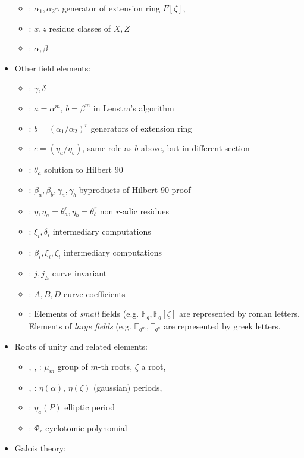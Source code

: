 \documentclass[12pt]{article}
\theoremstyle{plain}
\theoremstyle{definition}
\def\F{\ensuremath{\mathbb{F}}}
\newcounter{algorithm}
\begin{document}
\begin{itemize}
\begin{itemize}
  \item \kummer: $\alpha_1,\alpha_2\gamma$ generator of extension ring $F[\zeta]$,
  \item \kummer: $x,z$ residue classes of $X,Z$
  \item \rains: $\alpha,\beta$
  \end{itemize}
\item Other field elements:
  \begin{itemize}
  \item \poster: $\gamma, \delta$
  \item \poster: $a=\alpha^m$, $b=\beta^m$ in Lenstra's algorithm
  \item \kummer: $b=(\alpha_1/\alpha_2)^r$ generators of extension ring
  \item \kummer: $c=(\eta_a/\eta_b)$, same role as $b$ above, but in different section
  \item \kummer: $\theta_a$ solution to Hilbert 90
  \item \kummer: $\beta_a,\beta_b,\gamma_a,\gamma_b$ byproducts of Hilbert 90 proof
  \item \kummer: $\eta,\eta_a=\theta_a^r,\eta_b=\theta_b^r$ non $r$-adic residues
  \item \kummer: $\xi_i,\delta_i$ intermediary computations
  \item \kummer: $\beta_i,\xi_i,\zeta_i$ intermediary computations
  \item \rains: $j,j_E$ curve invariant
  \item \rains: $A,B,D$ curve coefficients
  \item \prop: Elements of \emph{small} fields (e.g. $\F_q,
    \F_q[\zeta]$ are represented by roman letters. Elements of
    \emph{large fields} (e.g. $\F_{q^m},\F_{q^n}$ are represented by
    greek letters.
  \end{itemize}
\item Roots of unity and related elements:
  \begin{itemize}
  \item \poster, \rains, \prop: $\mu_m$ group of $m$-th roots, $\zeta$ a root,
  \item \poster, \rains: $\eta(\alpha)$, $\eta(\zeta)$ (gaussian) periods,
  \item \rains: $\eta_a(P)$ elliptic period
  \item \kummer: $\Phi_r$ cyclotomic polynomial
  \end{itemize}
\item Galois theory:
  \begin{itemize}

\end{itemize}
\end{itemize}
\end{document}
